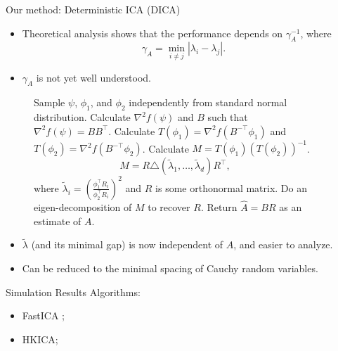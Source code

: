 \documentclass[final]{beamer} %
\begin{document}
\begin{frame}[c]
\begin{columns}[t,totalwidth=\textwidth]
	\begin{column}{0.01\textwidth}
	\end{column}
	\begin{column}{0.32\textwidth}
			
			\vspace{0.5ex}
		\begin{block}{Our method: Deterministic ICA (DICA)}	
			\begin{itemize}
				\item Theoretical analysis shows that the performance depends on $\gamma_A^{-1}$, where
					\[
					\gamma_A = \min_{i\neq j} \left\vert \lambda_i - \lambda_j\right \vert.
					\]
					\vspace{-1cm}
				\item $\gamma_A$ is not yet well understood.
			\end{itemize}	
			\begin{figure}
			\begin{algorithmic}[1]
				\STATE Sample $\psi$, $\phi_1$, and $\phi_2$ independently from standard normal distribution.
				\STATE Calculate $\nabla^2 f(\psi)$ and $B$ such that $\nabla^2 f(\psi) = BB^{\top}$.
				\STATE Calculate $T(\phi_1) = \nabla^2 f(B^{-\top}\phi_1)$ and $T(\phi_2) = \nabla^2 f(B^{-\top}\phi_2)$.
				\STATE Calculate $M = T(\phi_1)(T(\phi_2))^{-1}$.
					\[
					M = R \triangle\left( \tilde{\lambda}_1, \ldots, \tilde{\lambda}_d \right)R^{\top},
					\]
					where $\tilde{\lambda}_i = \left(\frac{\phi_1^{\top}R_i}{\phi_2^{\top}R_i}\right)^2$ and $R$ is some orthonormal matrix.
				\STATE Do an eigen-decomposition of $M$ to recover $R$.
				\STATE Return $\hat{A} = BR$ as an estimate of $A$. 
			\end{algorithmic}
			\end{figure}
			\begin{itemize}
				\item $\tilde{\lambda}$ (and its minimal gap) is now independent of $A$, and easier to analyze.
				\item Can be reduced to the minimal spacing of Cauchy random variables.
			\end{itemize}
		\end{block}
		\vspace{0.5ex}
		\begin{block}{Simulation Results}
			Algorithms:
			\begin{itemize}
				\item FastICA  \citep{szabo12separation};
				\item HKICA; 

\end{itemize}
\end{block}
\end{column}
\end{columns}
\end{frame}
\end{document}
